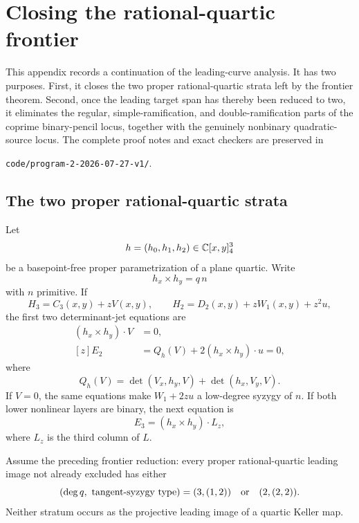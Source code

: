 \section{Closing the rational-quartic frontier}
\label{app:quartic-frontier-and-ramification}

This appendix records a continuation of the leading-curve analysis.  It has
two purposes.  First, it closes the two proper rational-quartic strata left
by the frontier theorem.  Second, once the leading target span has thereby
been reduced to two, it eliminates the regular, simple-ramification, and
double-ramification parts of the coprime binary-pencil locus, together with
the genuinely nonbinary quadratic-source locus.  The complete proof notes
and exact checkers are preserved in
\begin{center}
\texttt{code/program-2-2026-07-27-v1/}.
\end{center}

\subsection{The two proper rational-quartic strata}

Let
\[
h=(h_0,h_1,h_2)\in\mathbb C[x,y]_4^3
\]
be a basepoint-free proper parametrization of a plane quartic.  Write
\[
h_x\times h_y=q\,n
\]
with \(n\) primitive.  If
\[
H_3=C_3(x,y)+zV(x,y),\qquad
H_2=D_2(x,y)+zW_1(x,y)+z^2u,
\]
the first two determinant-jet equations are
\begin{align}
(h_x\times h_y)\cdot V&=0, \label{eq:frontier-first-jet}\\
[z]E_2&=Q_h(V)+2(h_x\times h_y)\cdot u=0, \label{eq:frontier-second-jet}
\end{align}
where
\[
Q_h(V)=\det(V_x,h_y,V)+\det(h_x,V_y,V).
\]
If \(V=0\), the same equations make \(W_1+2zu\) a low-degree
syzygy of \(n\).  If both lower nonlinear layers are binary, the next
equation is
\[
E_3=(h_x\times h_y)\cdot L_z,
\]
where \(L_z\) is the third column of \(L\).

\begin{theorem}
\label{thm:rational-quartic-frontier-exclusion}
Assume the preceding frontier reduction: every proper rational-quartic
leading image not already excluded has either
\[
(\deg q,\textup{ tangent-syzygy type})=(3,(1,2))
\quad\text{or}\quad
(2,(2,2)).
\]
Neither stratum occurs as the projective leading image of a quartic Keller
map.
\end{theorem}

